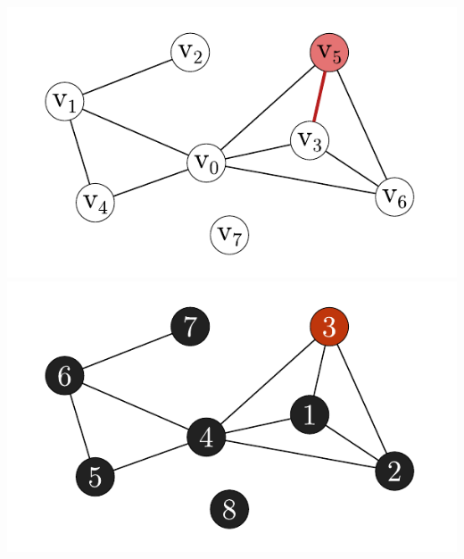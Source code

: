 \documentclass[xcolor=x11names,compress]{beamer}
\makeatletter
\def\beamer@writeslidentry@miniframesoff{%
  \expandafter\beamer@ifempty\expandafter{\beamer@framestartpage}{}%
  {%
    \clearpage\beamer@notesactions%
  }
}
\newcommand*{\miniframesoff}{\let\beamer@writeslidentry=\beamer@writeslidentry@miniframesoff}
\makeatother
\begin{document}
\begin{frame}
\begin{columns}
\begin{center}
\begin{overprint}
				\includegraphics[scale=0.6]{img/graph/chordalsimple_v5_highlighted.pdf}
				\onslide<3-4>\includegraphics[scale=0.6]{img/graph/peo_v5_highlighted.pdf}
			\end{overprint}
		\end{center}
	\end{columns}
\end{frame}

\begin{frame}
	\begin{overprint}
		\spymatrixpresentation{\matrixpeoa}
		\spymatrixpresentation{\matrixpeob}
		\spymatrixpresentation{\matrixpeoc}
		\spymatrixpresentation{\matrixpeod}
		\spymatrixpresentation{\matrixpeoe}
		\spymatrixpresentation{\matrixpeof}
		\spymatrixpresentation{\matrixpeog}
	\end{overprint}
\end{frame}

\bgroup
\miniframesoff
{}
\color{white}
\begin{frame}
\end{frame}
\end{document}
